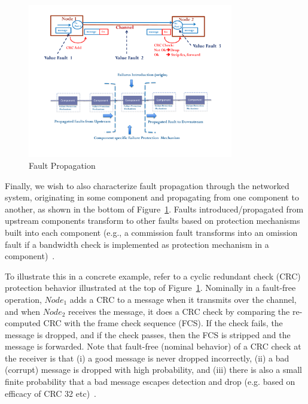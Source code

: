 \begin{figure}
\begin{center}
\includegraphics[width=0.8\textwidth]{figures/fault_propagation.pdf}
\caption{Fault Propagation}
\label{fig:fault_propagation}
\end{center}
\end{figure}

Finally, we wish to also characterize fault
propagation through the networked system, originating in some component and
propagating from one component to another, as shown in the bottom of
Figure~\ref{fig:fault_propagation}. Faults introduced/propagated from upstream
components transform to other faults based on protection mechanisms built
into
each component (e.g., a commission fault transforms into an omission fault
if a
bandwidth check is implemented as protection mechanism in a component)~\cite{theory}.

To illustrate this in a concrete example, refer to a cyclic redundant check
(CRC) protection behavior illustrated at the top of
Figure~\ref{fig:fault_propagation}. Nominally in a fault-free operation,
$Node_1$ adds a CRC to a message when it transmits over the channel, and
when
$Node_2$ receives the message, it does a CRC check by comparing the re-computed
CRC
with the frame check sequence (FCS). If the check fails, the message is dropped,
and if the check
passes, then the FCS is stripped and the message is forwarded. Note that
fault-free
(nominal behavior) of a CRC check at the receiver is that (i) a good message
is
never dropped incorrectly, (ii) a bad (corrupt) message is dropped with high
probability, and (iii) there is also a small finite probability that a bad
message escapes detection and drop (e.g. based on efficacy of CRC 32 etc)~\cite{crc}.

